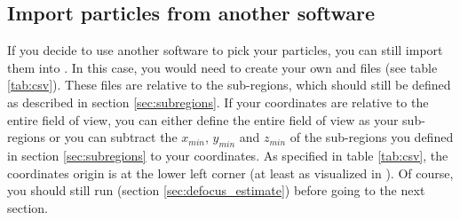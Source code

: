 \subsection{Import particles from another software} \label{sec:picking:import}

If you decide to use another software to pick your particles, you can still import them into {\emClarity}. In this case, you would need to create your own  and  files (see table \ref{tab:csv}). These files are relative to the sub-regions, which should still be defined as described in section \ref{sec:subregions}. If your coordinates are relative to the entire field of view, you can either define the entire field of view as your sub-regions or you can subtract the $x_{min}$, $y_{min}$ and $z_{min}$ of the sub-regions you defined in section \ref{sec:subregions} to your coordinates. As specified in table \ref{tab:csv}, the coordinates origin is at the lower left corner (at least as visualized in ). Of course, you should still run  (section \ref{sec:defocus_estimate}) before going to the next section.